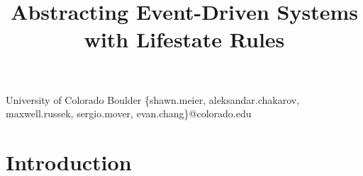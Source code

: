 \documentclass[10pt,reprint,nocopyrightspace,numbers]{sigplanconf}
\begin{document}



\setlength{\pdfpageheight}{\paperheight}
\setlength{\pdfpagewidth}{\paperwidth}




\title{Abstracting Event-Driven Systems with Lifestate Rules}

           {University of Colorado Boulder}
           {\{shawn.meier, aleksandar.chakarov, maxwell.russek, sergio.mover, evan.chang\}@colorado.edu}

\maketitle

\begin{abstract}

\end{abstract}




\section{Introduction}
\label{sec:introduction}
\end{document}
